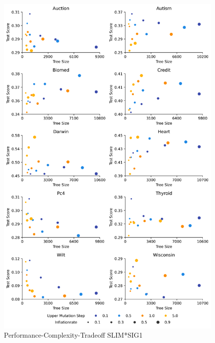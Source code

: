 
    \begin{figure}[h]
    \centering
    \includegraphics[width=\linewidth]{../Latex/Chapters/Figures/Results/inflationrate_performance_complexity_tradeoff_mulsig1.png}
    \caption{Performance-Complexity-Tradeoff SLIM*SIG1}
    \label{fig:performance_complexity_tradeoff_mulsig1}
    \end{figure}
    